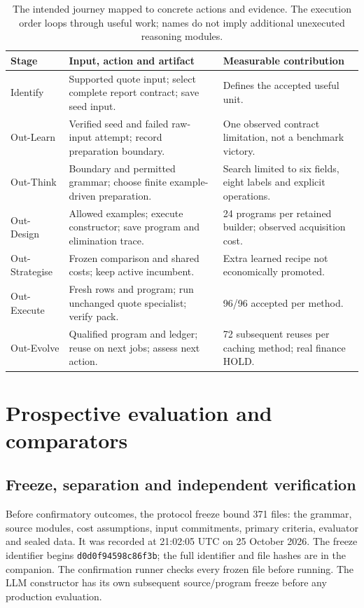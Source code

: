 \documentclass[11pt,letterpaper]{article}
\newcommand{\code}[1]{\texttt{\small #1}}
\begin{document}
\begin{table}[htbp]
\small
\caption{The intended journey mapped to concrete actions and evidence. The execution order loops through useful work; names do not imply additional unexecuted reasoning modules.}
\begin{tabularx}{\textwidth}{@{}P{.17\textwidth}YY@{}}
\toprule Stage & Input, action and artifact & Measurable contribution\\\midrule
Identify & Supported quote input; select complete report contract; save seed input. & Defines the accepted useful unit.\\[3pt]
Out-Learn & Verified seed and failed raw-input attempt; record preparation boundary. & One observed contract limitation, not a benchmark victory.\\[3pt]
Out-Think & Boundary and permitted grammar; choose finite example-driven preparation. & Search limited to six fields, eight labels and explicit operations.\\[3pt]
Out-Design & Allowed examples; execute constructor; save program and elimination trace. & 24 programs per retained builder; observed acquisition cost.\\[3pt]
Out-Strategise & Frozen comparison and shared costs; keep active incumbent. & Extra learned recipe not economically promoted.\\[3pt]
Out-Execute & Fresh rows and program; run unchanged quote specialist; verify pack. & 96/96 accepted per method.\\[3pt]
Out-Evolve & Qualified program and ledger; reuse on next jobs; assess next action. & 72 subsequent reuses per caching method; real finance HOLD.\\
\bottomrule
\end{tabularx}
\end{table}

\section{Prospective evaluation and comparators}
\label{sec:design}

\subsection{Freeze, separation and independent verification}

Before confirmatory outcomes, the protocol freeze bound 371 files: the grammar, source modules, cost assumptions, input commitments, primary criteria, evaluator and sealed data. It was recorded at 21:02:05 UTC on 25 October 2026. The freeze identifier begins \code{d0d0f94598c86f3b}; the full identifier and file hashes are in the companion. The confirmation runner checks every frozen file before running. The LLM constructor has its own subsequent source/program freeze before any production evaluation.
\end{document}
